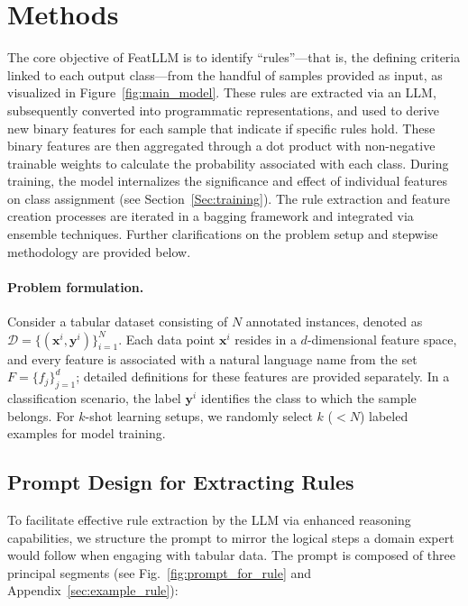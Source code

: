 \section{Methods}
The core objective of \textsf{FeatLLM} is to identify ``rules''—that is, the defining criteria linked to each output class—from the handful of samples provided as input, as visualized in Figure~\ref{fig:main_model}. These rules are extracted via an LLM, subsequently converted into programmatic representations, and used to derive new binary features for each sample that indicate if specific rules hold. These binary features are then aggregated through a dot product with non-negative trainable weights to calculate the probability associated with each class. During training, the model internalizes the significance and effect of individual features on class assignment (see Section~\ref{Sec:training}). The rule extraction and feature creation processes are iterated in a bagging framework and integrated via ensemble techniques. Further clarifications on the problem setup and stepwise methodology are provided below.

\vspace*{-0.12in}
\paragraph{Problem formulation.} Consider a tabular dataset consisting of $N$ annotated instances, denoted as $\mathcal{D} = \{(\mathbf{x}^i, \mathbf{y}^i)\}_{i=1}^{N}$. Each data point $\mathbf{x}^i$ resides in a $d$-dimensional feature space, and every feature is associated with a natural language name from the set $F = \{f_j\}_{j=1}^{d}$; detailed definitions for these features are provided separately. In a classification scenario, the label $\mathbf{y}^i$ identifies the class to which the sample belongs. For $k$-shot learning setups, we randomly select $k$ ($<N$) labeled examples for model training.

\subsection{Prompt Design for Extracting Rules}
\label{Sec:prompt_design}
To facilitate effective rule extraction by the LLM via enhanced reasoning capabilities, we structure the prompt to mirror the logical steps a domain expert would follow when engaging with tabular data. The prompt is composed of three principal segments (see Fig.~\ref{fig:prompt_for_rule} and Appendix~\ref{sec:example_rule}):

